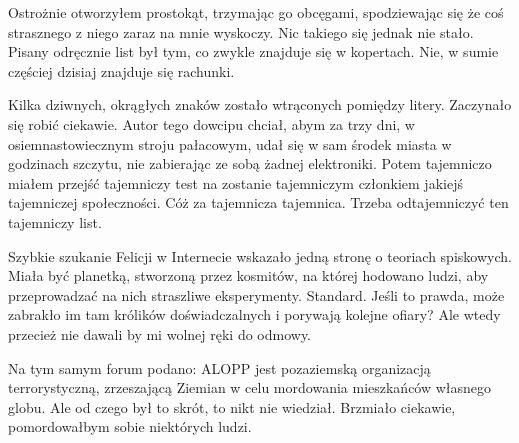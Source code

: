 Ostrożnie otworzyłem prostokąt, trzymając go obcęgami, spodziewając się że coś strasznego z niego zaraz na mnie wyskoczy.
Nic takiego się jednak nie stało.
Pisany odręcznie list był tym, co zwykle znajduje się w kopertach. Nie, w sumie częściej dzisiaj znajduje się rachunki.


Kilka dziwnych, okrągłych znaków zostało wtrąconych pomiędzy litery. 
Zaczynało się robić ciekawie. Autor tego dowcipu chciał, abym za trzy dni, w osiemnastowiecznym stroju pałacowym,
udał się w sam środek miasta w godzinach szczytu, nie zabierając ze sobą żadnej elektroniki.
Potem tajemniczo miałem przejść tajemniczy test na zostanie tajemniczym członkiem jakiejś tajemniczej społeczności. Cóż za tajemnicza tajemnica.
Trzeba odtajemniczyć ten tajemniczy list.

Szybkie szukanie Felicji w Internecie wskazało jedną stronę o teoriach spiskowych.
Miała być planetką, stworzoną przez kosmitów, na której hodowano ludzi, aby przeprowadzać na nich straszliwe eksperymenty. Standard.
Jeśli to prawda, może zabrakło im tam królików doświadczalnych i porywają kolejne ofiary?
Ale wtedy przecież nie dawali by mi wolnej ręki do odmowy.

Na tym samym forum podano: ALOPP jest pozaziemską organizacją terrorystyczną, zrzeszającą Ziemian w celu mordowania mieszkańców własnego globu.
Ale od czego był to skrót, to nikt nie wiedział. Brzmiało ciekawie, pomordowałbym sobie niektórych ludzi.

